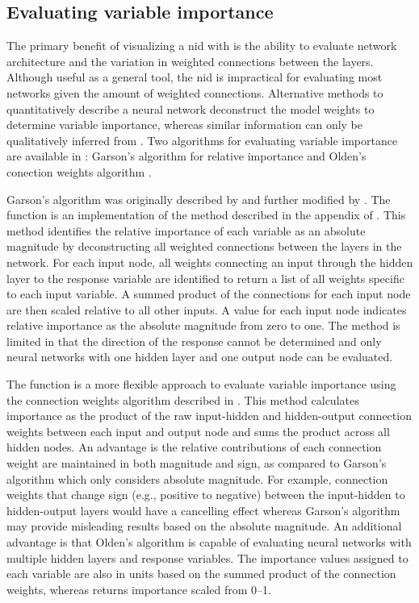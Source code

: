 \documentclass[article,shortnames]{jss}\usepackage[]{graphicx}\usepackage[]{color}
\begin{document}
\subsection{Evaluating variable importance}

The primary benefit of visualizing a \ac{nid} with  is the ability to evaluate network architecture and the variation in weighted connections between the layers.  Although useful as a general tool, the \ac{nid} is impractical for evaluating most networks given the amount of weighted connections.  Alternative methods to quantitatively describe a neural network deconstruct the model weights to determine variable importance, whereas similar information can only be qualitatively inferred from .  Two algorithms for evaluating variable importance are available in : Garson's algorithm for relative importance \citep{Garson91,Goh95} and Olden's conection weights algorithm \citep{Olden04}.

Garson's algorithm was originally described by \citet{Garson91} and further modified by \citet{Goh95}.  The  function is an implementation of the method described in the appendix of \citet{Goh95}.  This method identifies the relative importance of each variable as an absolute magnitude by deconstructing all weighted connections between the layers in the network. For each input node, all weights connecting an input through the hidden layer to the response variable are identified to return a list of all weights specific to each input variable. A summed product of the connections for each input node are then scaled relative to all other inputs. A value for each input node indicates relative importance as the absolute magnitude from zero to one. The method is limited in that the direction of the response cannot be determined and only neural networks with one hidden layer and one output node can be evaluated.

The  function is a more flexible approach to evaluate variable importance using the connection weights algorithm described in \citet{Olden04}. This method calculates importance as the product of the raw input-hidden and hidden-output connection weights between each input and output node and sums the product across all hidden nodes. An advantage is the relative contributions of each connection weight are maintained in both magnitude and sign, as compared to Garson's algorithm which only considers absolute magnitude. For example, connection weights that change sign (e.g., positive to negative) between the input-hidden to hidden-output layers would have a cancelling effect whereas Garson's algorithm may provide misleading results based on the absolute magnitude. An additional advantage is that Olden's algorithm is capable of evaluating neural networks with multiple hidden layers and response variables. The importance values assigned to each variable are also in units based on the summed product of the connection weights, whereas  returns importance scaled from 0--1.
\end{document}
